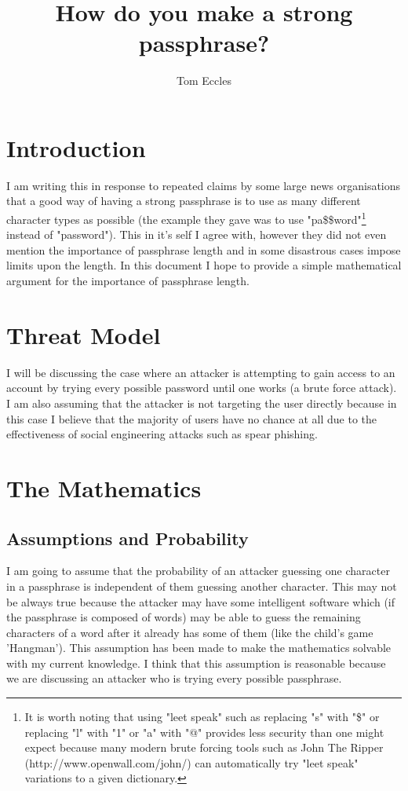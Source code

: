 \documentclass[11pt,a4paper]{article}
\begin{document}
\title{How do you make a strong passphrase?}
\author{Tom Eccles}
\maketitle

\section{Introduction}
I am writing this in response to repeated claims by some large news organisations that a good way of having a strong passphrase is to use as many different character types as possible (the example they gave was to use "pa\$\$word"\footnote{It is worth noting that using "leet speak" such as replacing "s" with "\$" or replacing "l" with "1" or "a" with "@" provides less security than one might expect because many modern brute forcing tools such as John The Ripper (http://www.openwall.com/john/) can automatically try "leet speak" variations to a given dictionary.} instead of "password"). This in it's self I agree with, however they did not even mention the importance of passphrase length and in some disastrous cases impose limits upon the length. In this document I hope to provide a simple mathematical argument for the importance of passphrase length. 

\section{Threat Model}
I will be discussing the case where an attacker is attempting to gain access to an account by trying every possible password until one works (a brute force attack). I am also assuming that the attacker is not targeting the user directly because in this case I believe that the majority of users have no chance at all due to the effectiveness of social engineering attacks such as spear phishing. 

\section{The Mathematics}
\subsection{Assumptions and Probability}
I am going to assume that the probability of an attacker guessing one character in a passphrase is independent of them guessing another character. This may not be always true because the attacker may have some intelligent software which (if the passphrase is composed of words) may be able to guess the remaining characters of a word after it already has some of them (like the child's game 'Hangman'). This assumption has been made to make the mathematics solvable with my current knowledge. I think that this assumption is reasonable because we are discussing an attacker who is trying every possible passphrase.
\end{document}
